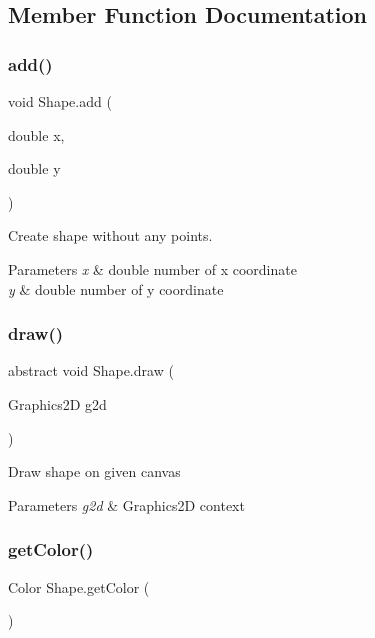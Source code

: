 \subsection{Member Function Documentation}
\mbox{\label{class_shape_a32626b5ccab1d89c6724af95121dc125}} 
\subsubsection{\texorpdfstring{add()}{add()}}
{\footnotesize\ttfamily void Shape.\+add (\begin{DoxyParamCaption}\item[{double}]{x,  }\item[{double}]{y }\end{DoxyParamCaption})}

Create shape without any points. 
\begin{DoxyParams}{Parameters}
{\em x} & double number of x coordinate \\
\hline
{\em y} & double number of y coordinate \\
\hline
\end{DoxyParams}
\mbox{\label{class_shape_a49dd492d72e51ebff5323f12061b970e}} 
\subsubsection{\texorpdfstring{draw()}{draw()}}
{\footnotesize\ttfamily abstract void Shape.\+draw (\begin{DoxyParamCaption}\item[{Graphics2D}]{g2d }\end{DoxyParamCaption})\hspace{0.3cm}{\ttfamily [abstract]}}

Draw shape on given canvas 
\begin{DoxyParams}{Parameters}
{\em g2d} & Graphics2D context \\
\hline
\end{DoxyParams}
\mbox{\label{class_shape_a4271dba03c30547a4e0c87418cc07bf8}} 
\subsubsection{\texorpdfstring{get\+Color()}{getColor()}}
{\footnotesize\ttfamily Color Shape.\+get\+Color (\begin{DoxyParamCaption}{ }\end{DoxyParamCaption})}

